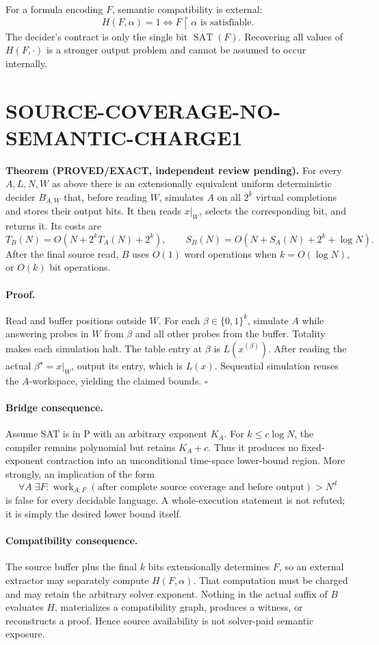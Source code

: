 \documentclass[11pt]{article}
\newcommand{\PROVED}{\textbf{PROVED/EXACT}}
\begin{document}
For a formula encoding \(F\), semantic compatibility is external:
\[
H(F,\alpha)=1 \iff F\upharpoonright\alpha \text{ is satisfiable}.
\]
The decider's contract is only the single bit \(\operatorname{SAT}(F)\).
Recovering all values of \(H(F,\cdot)\) is a stronger output problem and
cannot be assumed to occur internally.

\section*{SOURCE-COVERAGE-NO-SEMANTIC-CHARGE1}
\textbf{Theorem (\PROVED, independent review pending).}
For every \(A,L,N,W\) as above there is an extensionally equivalent uniform
deterministic decider \(B_{A,W}\) that, before reading \(W\), simulates
\(A\) on all \(2^k\) virtual completions and stores their output bits. It
then reads \(x|_W\), selects the corresponding bit, and returns it. Its costs
are
\[
T_B(N)=O\!\left(N+2^kT_A(N)+2^k\right),\qquad
S_B(N)=O\!\left(N+S_A(N)+2^k+\log N\right).
\]
After the final source read, \(B\) uses \(O(1)\) word operations when
\(k=O(\log N)\), or \(O(k)\) bit operations.

\paragraph{Proof.}
Read and buffer positions outside \(W\). For each
\(\beta\in\{0,1\}^k\), simulate \(A\) while answering probes in \(W\) from
\(\beta\) and all other probes from the buffer. Totality makes each
simulation halt. The table entry at \(\beta\) is \(L(x^{(\beta)})\).
After reading the actual \(\beta^\star=x|_W\), output its entry, which is
\(L(x)\). Sequential simulation reuses the \(A\)-workspace, yielding the
claimed bounds. \(\square\)

\paragraph{Bridge consequence.}
Assume SAT is in P with an arbitrary exponent \(K_A\). For
\(k\le c\log N\), the compiler remains polynomial but retains \(K_A+c\).
Thus it produces no fixed-exponent contraction into an unconditional
time-space lower-bound region. More strongly, an implication of the form
\[
\forall A\;\exists F:
\operatorname{work}_{A,F}(\text{after complete source coverage and before
output})>N^d
\]
is false for every decidable language. A whole-execution statement is not
refuted; it is simply the desired lower bound itself.

\paragraph{Compatibility consequence.}
The source buffer plus the final \(k\) bits extensionally determines \(F\),
so an external extractor may separately compute \(H(F,\alpha)\). That
computation must be charged and may retain the arbitrary solver exponent.
Nothing in the actual suffix of \(B\) evaluates \(H\), materializes a
compatibility graph, produces a witness, or reconstructs a proof. Hence
source availability is not solver-paid semantic exposure.
\end{document}
